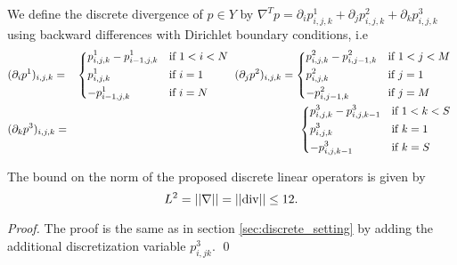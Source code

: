     \begin{definition} %
    \label{def:discrete_divergence_operator_ms}

        We define the discrete divergence of $p \in Y$ by $\nabla^{T} p = \partial_{i}p^{1}_{i, j, k} + \partial_{j}p^{2}_{i, j, k} + \partial_{k}p^{3}_{i, j, k}$ using backward differences with Dirichlet boundary conditions, i.e
            \begin{eqnarray}
                &(\partial_{i}p^{1})_{i, j, k} =&
                    \begin{dcases*}
                        p^{1}_{i, j, k} - p^{1}_{i-1, j, k} & \textnormal{if $1 < i < N$} \\
                        p^{1}_{i, j, k} & \textnormal{if $i = 1$} \\
                        -p^{1}_{i-1, j, k} & \textnormal{if $i = N$}
                    \end{dcases*}
                \notag
                (\partial_{j}p^{2})_{i, j, k} =
                    \begin{dcases*}
                        p^{2}_{i, j, k} - p^{2}_{i, j-1, k} & \textnormal{if $1 < j < M$} \\
                        p^{2}_{i, j, k} & \textnormal{if $j = 1$} \\
                        -p^{2}_{i, j-1, k} & \textnormal{if $j = M$}
                    \end{dcases*}
                \notag \\
                &(\partial_{k}p^{3})_{i, j, k} =&
                    \begin{dcases*}
                        p^{3}_{i, j, k} - p^{3}_{i, j, k-1} & \textnormal{if $1 < k < S$} \\
                        p^{3}_{i, j, k} & \textnormal{if $k = 1$} \\
                        -p^{3}_{i, j, k-1} & \textnormal{if $k = S$}
                    \end{dcases*}
                \notag
            \end{eqnarray}

    \end{definition}

    \begin{proposition} %
        \label{prop:bound_on_the_norm}

        The bound on the norm of the proposed discrete linear operators is given by
            \begin{equation}
                L^{2} = ||\nabla|| = ||\textnormal{div}|| \le 12.
            \end{equation}

    \end{proposition}

    \begin{proof}
    	The proof is the same as in section \ref{sec:discrete_setting} by adding the additional discretization variable $p^{3}_{i,jk}$.
    	\qed
    \end{proof}

